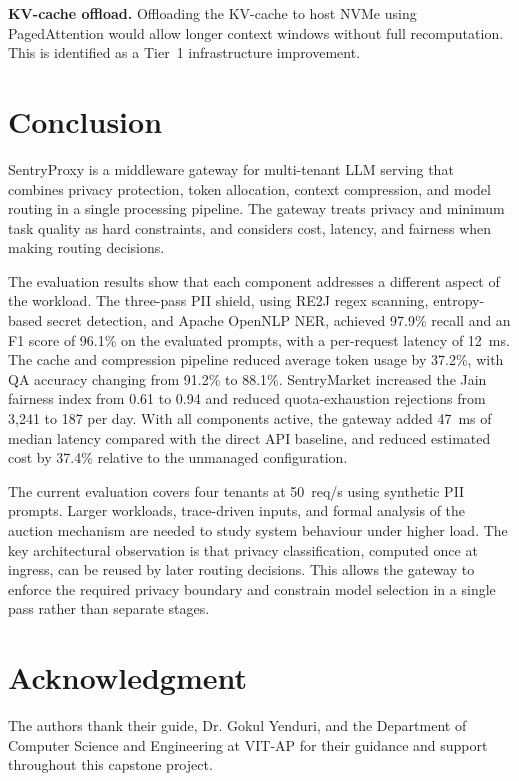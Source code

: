 \documentclass[conference]{IEEEtran}
\begin{document}
\textbf{KV-cache offload.} Offloading the KV-cache to host NVMe using PagedAttention would allow longer context windows without full recomputation. This is identified as a Tier~1 infrastructure improvement.

\section{Conclusion}

SentryProxy is a middleware gateway for multi-tenant LLM serving that combines privacy protection, token allocation, context compression, and model routing in a single processing pipeline. The gateway treats privacy and minimum task quality as hard constraints, and considers cost, latency, and fairness when making routing decisions.

The evaluation results show that each component addresses a different aspect of the workload. The three-pass PII shield, using RE2J regex scanning, entropy-based secret detection, and Apache OpenNLP NER, achieved 97.9\% recall and an F1 score of 96.1\% on the evaluated prompts, with a per-request latency of 12~ms. The cache and compression pipeline reduced average token usage by 37.2\%, with QA accuracy changing from 91.2\% to 88.1\%. SentryMarket increased the Jain fairness index from 0.61 to 0.94 and reduced quota-exhaustion rejections from 3,241 to 187 per day. With all components active, the gateway added 47~ms of median latency compared with the direct API baseline, and reduced estimated cost by 37.4\% relative to the unmanaged configuration.

The current evaluation covers four tenants at 50~req/s using synthetic PII prompts. Larger workloads, trace-driven inputs, and formal analysis of the auction mechanism are needed to study system behaviour under higher load. The key architectural observation is that privacy classification, computed once at ingress, can be reused by later routing decisions. This allows the gateway to enforce the required privacy boundary and constrain model selection in a single pass rather than separate stages.

\section*{Acknowledgment}
The authors thank their guide, Dr. Gokul Yenduri, and the Department of Computer Science and Engineering at VIT-AP for their guidance and support throughout this capstone project.
\end{document}
